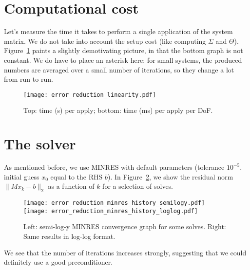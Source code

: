 \documentclass[11pt,a4paper]{amsart}
\theoremstyle{definition}
\begin{document}
\section*{Computational cost}
Let's measure the time it takes to perform a single application of the system
matrix. We do not take into account the setup cost (like
computing $\Sigma$ and $\Theta$). Figure~\ref{fig:linearity} paints a slightly
demotivating picture, in that the bottom graph is not constant. We do have to
place an asterisk here: for small systems, the produced numbers are averaged over
a small number of iterations, so they change a lot from run to run.
\begin{figure}[h!]
  \texttt{[image: error\_reduction\_linearity.pdf]}
  \caption{Top: time (s) per apply; bottom: time (ms) per apply per DoF.}
  \label{fig:linearity}
\end{figure}

\section*{The solver}
As mentioned before, we use MINRES with default parameters (tolerance $10^{-5}$,
initial guess $x_0$ equal to the RHS $b$). In Figure~\ref{fig:minres}, we show
the residual norm $\|M x_k - b\|_2$ as a function of $k$ for a selection of solves.
\begin{figure}[h!]
  \texttt{[image: error\_reduction\_minres\_history\_semilogy.pdf]}
  \texttt{[image: error\_reduction\_minres\_history\_loglog.pdf]}
  \caption{Left: semi-log-y MINRES convergence graph for some solves. Right: Same results in log-log format.}
  \label{fig:minres}
\end{figure}
We see that the number of iterations increases strongly, suggesting that we could
definitely use a good preconditioner.
\end{document}
